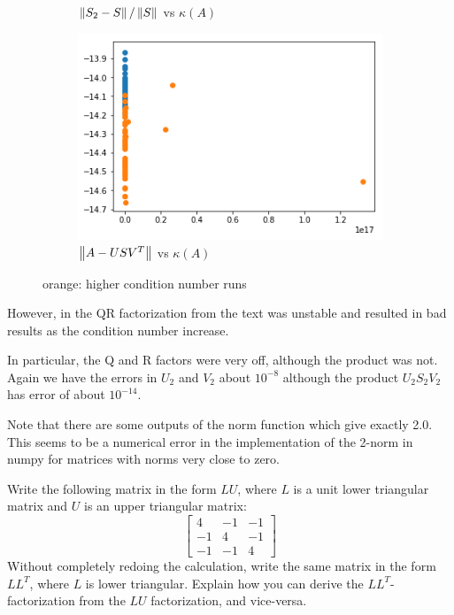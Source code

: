 \documentclass[10pt]{article}
\begin{document}
\begin{solution}[Solution]
\begin{enumerate}
\begin{figure}[H]
\begin{subfigure}{.45\textwidth}
                \caption{\(\left\lVert S_2-S\right\rVert/\left\lVert S\right\rVert\) vs \( \kappa(A) \)}
            \end{subfigure}            
            \begin{subfigure}{.45\textwidth}\centering
                \includegraphics[width=.9\textwidth]{img/AUSV.png}
                \caption{\(\left\lVert A-USV^T\right\rVert\) vs \( \kappa(A) \)}
            \end{subfigure}
            \caption{orange: higher condition number runs}
        \end{figure}

However, in the QR factorization from the text was unstable and resulted in bad results as the condition number increase. 

In particular, the Q and R factors were very off, although the product was not. 
Again we have the errors in \( U_2 \) and \( V_2\) about \( 10^{-8} \) although the product \( U_2S_2V_2 \) has error of about \( 10^{-14} \).

Note that there are some outputs of the norm function which give exactly 2.0. This seems to be a numerical error in the implementation of the 2-norm in numpy for matrices with norms very close to zero.

\end{enumerate}
\end{solution}


\begin{problem}[Exercise 3]
Write the following matrix in the form \(LU\), where \(L\) is a unit lower
triangular matrix and \(U\) is an upper triangular matrix:
\[
\left[ \begin{array}{rrr} 4 & -1 & -1 \\ -1 & 4 & -1 \\ -1 & -1 & 4 \end{array} \right] 
\]
Without completely redoing the calculation, write the same matrix in the form \(L L^T\), 
where \(L\) is lower triangular.  Explain how you can derive the \(L L^T\)-factorization
from the \(LU\) factorization, and vice-versa.
\end{problem}
\end{document}
